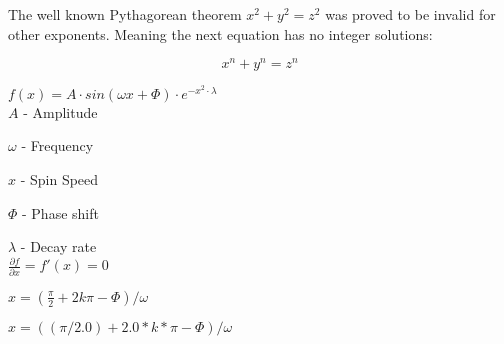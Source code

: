 \documentclass{article}
\begin{document}
The well known Pythagorean theorem \(x^2 + y^2 = z^2\) was 
proved to be invalid for other exponents. 
Meaning the next equation has no integer solutions:

\[ x^n + y^n = z^n \]

$f(x) = A \cdot sin(\omega x + \Phi) \cdot e^{-x^2 \cdot \lambda}$\\

$A$ - Amplitude

$\omega$ - Frequency

$x$ - Spin Speed

$\Phi$ - Phase shift

$\lambda$ - Decay rate\\

$\frac{\partial f}{\partial x} = f'(x) = 0$

$x = (\frac{\pi}{2} + 2k\pi - \Phi) / \omega$

$x = ((\pi / 2.0) + 2.0*k*\pi - \Phi) / \omega$
\end{document}
